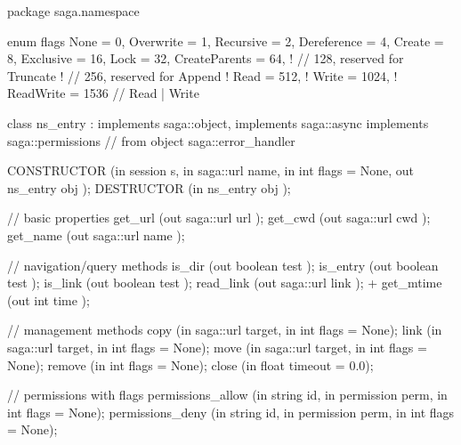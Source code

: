  \begin{myspec}
  package saga.namespace
  {
    enum flags
    {
      None            =    0,
      Overwrite       =    1,
      Recursive       =    2,
      Dereference     =    4,
      Create          =    8,
      Exclusive       =   16,
      Lock            =   32,
      CreateParents   =   64,
!     //                 128,    reserved for Truncate
!     //                 256,    reserved for Append
!     Read            =  512,
!     Write           = 1024,
!     ReadWrite       = 1536  // Read | Write
    }
 
 
    class ns_entry : implements   saga::object,
                     implements   saga::async
                     implements   saga::permissions
                  // from object  saga::error_handler
    {
      CONSTRUCTOR        (in  session        s,
                          in  saga::url      name,
                          in  int            flags   = None,
                          out ns_entry       obj     );
      DESTRUCTOR         (in  ns_entry       obj     );
 
      // basic properties
      get_url            (out saga::url      url     );
      get_cwd            (out saga::url      cwd     );
      get_name           (out saga::url      name    );
 
      // navigation/query methods
      is_dir             (out boolean        test    );
      is_entry           (out boolean        test    );
      is_link            (out boolean        test    );
      read_link          (out saga::url      link    );
+     get_mtime          (out int            time    );
 
      // management methods
      copy               (in  saga::url      target,
                          in  int            flags = None);
      link               (in  saga::url      target,
                          in  int            flags = None);
      move               (in  saga::url      target,
                          in  int            flags = None);
      remove             (in  int            flags = None);
      close              (in  float          timeout = 0.0);
 
 
      // permissions with flags
      permissions_allow  (in  string         id,
                          in  permission     perm, 
                          in  int            flags = None);
      permissions_deny   (in  string         id,
                          in  permission     perm, 
                          in  int            flags = None);
    }
 
}
\end{myspec}
